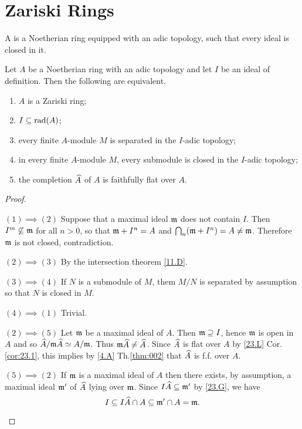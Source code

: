 \documentclass[../main]{subfiles}
\begin{document}
\section{Zariski Rings}\label{sec:24}

\begin{pardefinition}
A  is a Noetherian ring equipped with an adic topology, such that every ideal is closed in it. 
\end{pardefinition}

\begin{theorem}
\label{thm:056}
Let $A$ be a Noetherian ring with an adic topology and let $I$ be an ideal of definition. Then the following are equivalent. 

\begin{enumerate}[label=(\arabic*)]
    \item $A$ is a Zariski ring;
    \item $I \subseteq \operatorname{rad}(A)$;
    \item every finite $A$-module $M$ is separated in the $I$-adic topology;
    \item in every finite $A$-module $M$, every submodule is closed in the $I$-adic topology;
    \item the completion $\widehat{A}$ of $A$ is faithfully flat over $A$. 
\end{enumerate}
\end{theorem}

\begin{proof}\phantom{,}
\begin{implyenumerate}
    \item[$(1) \implies (2)$] Suppose that a maximal ideal $\mathfrak{m}$ does not contain $I$. Then $I^m \not \subseteq \mathfrak{m}$ for all $n > 0$, so that $\mathfrak{m} + I^n = A$ and $\bigcap_n (\mathfrak{m} + I^n) = A \ne \mathfrak{m}$. Therefore $\mathfrak{m}$ is not closed, contradiction. 
    \item[$(2) \implies (3)$] By the intersection theorem \ref{11.D}.
    \item[$(3) \implies (4)$] If $N$ is a submodule of $M$, them $M/N$ is separated by assumption so that $N$ is closed in $M$.
    \item[$(4) \implies (1)$] Trivial.
    \item[$(2) \implies (5)$] Let $\mathfrak{m}$ be a maximal ideal of $A$. Then $\mathfrak{m} \supseteq I$, hence $\mathfrak{m}$ is open in $A$ and so $\widehat{A}/\mathfrak{m} \widehat{A} \simeq A/\mathfrak{m}$. Thus $\mathfrak{m} \widehat{A} \ne \widehat{A}$. Since $\widehat{A}$ is flat over $A$ by \ref{23.L} Cor.\ref{cor:23.1}, this implies by \ref{4.A} Th.\ref{thm:002} that $\widehat{A}$ is f.f. over $A$. 
    \item[$(5) \implies (2)$] If $\mathfrak{m}$ is a maximal ideal of $A$ then there exists, by assumption, a maximal ideal $\mathfrak{m}'$ of $\widehat{A}$ lying over $\mathfrak{m}$. Since $I \widehat{A} \subseteq \mathfrak{m}'$ by \ref{23.G}, we have \[I \subseteq I \widehat{A} \cap A \subseteq \mathfrak{m}' \cap A = \mathfrak{m}.\]
\end{implyenumerate}
\end{proof}
\end{document}
